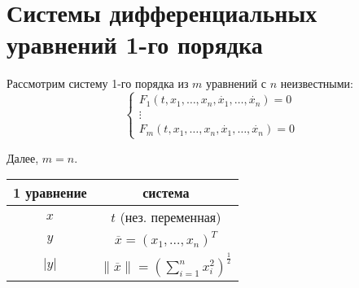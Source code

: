 \chapter{Системы дифференциальных уравнений 1-го порядка}


\begin{note}
    Рассмотрим систему 1-го порядка из $ m $ уравнений с $ n $ неизвестными:
    \begin{equation}\label{eq:3.0.1}
        \left\{\begin{array}{l}
            F_1(t,x_1,\ldots,x_n,\dot{x_1},\ldots,\dot{x_n}) = 0 \\
            \vdots                                               \\
            F_m(t,x_1,\ldots,x_n,\dot{x_1},\ldots,\dot{x_n}) = 0
        \end{array}\right.
    \end{equation}

    Далее, $ m = n $.

    \begin{center}
        \begin{tabular}{ c|c }
            1 уравнение & система                                                               \\
            \hline
            $ x $       & $ t $ (нез. переменная)                                               \\
            $ y $       & $ \overline{x} = (x_1,\ldots,x_n)^T $                                 \\
            $ | y |  $  & $ \|\overline{x}\| = \left(\sum_{i=1}^{n}x_i^2\right)^{\frac{1}{2}} $ \\
        \end{tabular}
    \end{center}
\end{note}

